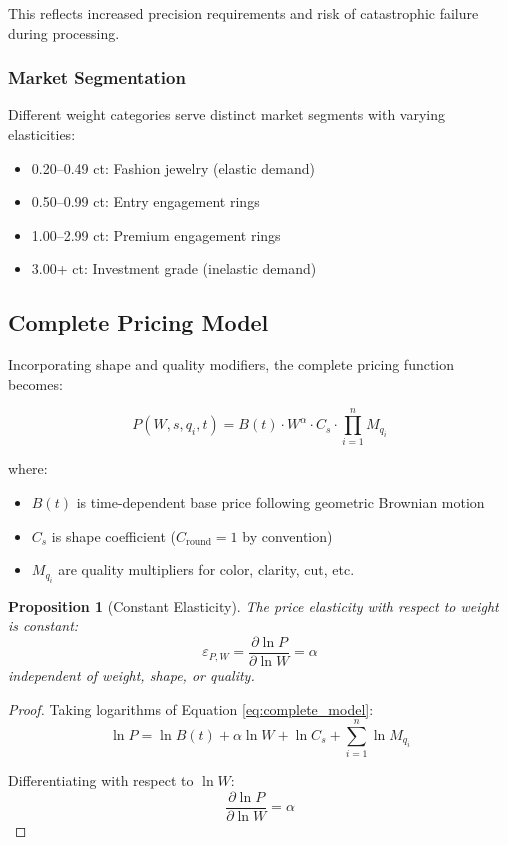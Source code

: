 \documentclass[12pt,a4paper]{article}
\newtheorem{proposition}{Proposition}
\begin{document}
This reflects increased precision requirements and risk of catastrophic failure during processing.

\subsubsection{Market Segmentation}

Different weight categories serve distinct market segments with varying elasticities:
\begin{itemize}
    \item 0.20--0.49 ct: Fashion jewelry (elastic demand)
    \item 0.50--0.99 ct: Entry engagement rings
    \item 1.00--2.99 ct: Premium engagement rings
    \item 3.00+ ct: Investment grade (inelastic demand)
\end{itemize}

\subsection{Complete Pricing Model}

Incorporating shape and quality modifiers, the complete pricing function becomes:

\begin{equation}
P(W, s, q_i, t) = B(t) \cdot W^{\alpha} \cdot C_s \cdot \prod_{i=1}^n M_{q_i}
\label{eq:complete_model}
\end{equation}

where:
\begin{itemize}
    \item $B(t)$ is time-dependent base price following geometric Brownian motion
    \item $C_s$ is shape coefficient ($C_{\text{round}} = 1$ by convention)
    \item $M_{q_i}$ are quality multipliers for color, clarity, cut, etc.
\end{itemize}

\begin{proposition}[Constant Elasticity]
The price elasticity with respect to weight is constant:
\begin{equation}
\varepsilon_{P,W} = \frac{\partial \ln P}{\partial \ln W} = \alpha
\end{equation}
independent of weight, shape, or quality.
\end{proposition}

\begin{proof}
Taking logarithms of Equation \ref{eq:complete_model}:
\begin{equation}
\ln P = \ln B(t) + \alpha \ln W + \ln C_s + \sum_{i=1}^n \ln M_{q_i}
\end{equation}

Differentiating with respect to $\ln W$:
\begin{equation}
\frac{\partial \ln P}{\partial \ln W} = \alpha
\end{equation}
\end{proof}
\end{document}
